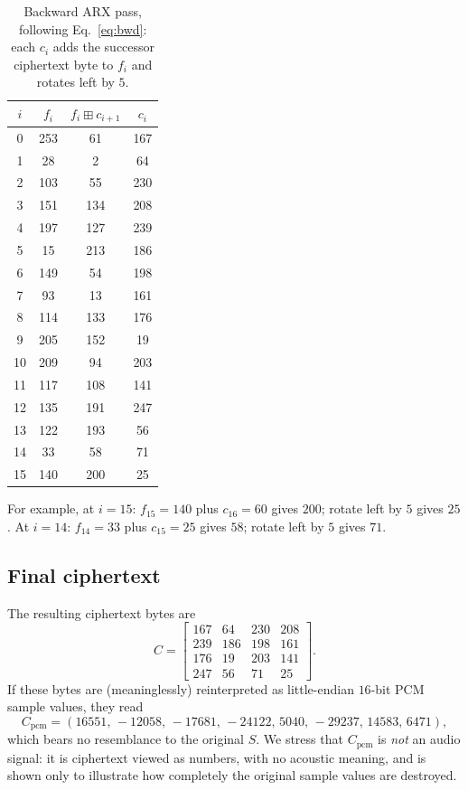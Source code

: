 \documentclass[pdflatex,sn-mathphys-num]{sn-jnl}%
\theoremstyle{thmstyleone}%
\theoremstyle{thmstyletwo}%
\theoremstyle{thmstylethree}%
\begin{document}
\begin{table}[htbp]
\centering
\caption{Backward ARX pass, following Eq.~\eqref{eq:bwd}: each $c_i$ adds the successor ciphertext byte to $f_i$ and rotates left by $5$.}
\label{tab:bwd}
\small
\begin{tabular}{cccc}
\toprule
$i$ & $f_i$ & $f_i\boxplus c_{i+1}$ & $c_i$ \\
\midrule
0 & 253 & 61 & 167 \\
1 & 28 & 2 & 64 \\
2 & 103 & 55 & 230 \\
3 & 151 & 134 & 208 \\
4 & 197 & 127 & 239 \\
5 & 15 & 213 & 186 \\
6 & 149 & 54 & 198 \\
7 & 93 & 13 & 161 \\
8 & 114 & 133 & 176 \\
9 & 205 & 152 & 19 \\
10 & 209 & 94 & 203 \\
11 & 117 & 108 & 141 \\
12 & 135 & 191 & 247 \\
13 & 122 & 193 & 56 \\
14 & 33 & 58 & 71 \\
15 & 140 & 200 & 25 \\
\bottomrule
\end{tabular}
\end{table}

For example, at $i=15$: $f_{15}=140$ plus $c_{16}=60$ gives $200$; rotate left by $5$ gives $25$. At $i=14$: $f_{14}=33$ plus $c_{15}=25$ gives $58$; rotate left by $5$ gives $71$.

\subsection{Final ciphertext}

The resulting ciphertext bytes are
\begin{equation*}
C=\begin{bmatrix}167&64&230&208\\239&186&198&161\\176&19&203&141\\247&56&71&25\end{bmatrix}.
\end{equation*}
If these bytes are (meaninglessly) reinterpreted as little-endian $16$-bit PCM sample values, they read
\begin{equation*}
C_{\mathrm{pcm}} = (16551,\,-12058,\,-17681,\,-24122,\,5040,\,-29237,\,14583,\,6471),
\end{equation*}
which bears no resemblance to the original $S$. We stress that $C_{\mathrm{pcm}}$ is \emph{not} an audio signal: it is ciphertext viewed as numbers, with no acoustic meaning, and is shown only to illustrate how completely the original sample values are destroyed.
\end{document}
